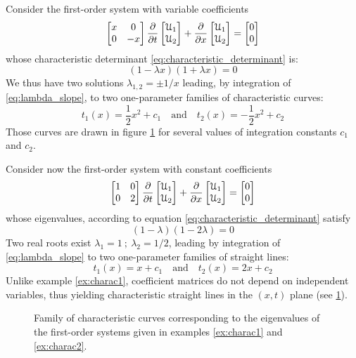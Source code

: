 \begin{example}
  \label{ex:charac1}
  Consider the first-order system with variable coefficients
\begin{equation*}
 \left[\begin{matrix}x &0 \\0 &-x\end{matrix}\right] \frac{\partial }{\partial t} \left[\begin{matrix}\mathcal{U}_1 \\ \mathcal{U}_2\end{matrix}\right] + \frac{\partial }{\partial x}\left[\begin{matrix}\mathcal{U}_1 \\ \mathcal{U}_2\end{matrix}\right] = \left[\begin{matrix}0 \\0\end{matrix}\right]
\end{equation*}
whose characteristic determinant \eqref{eq:characteristic_determinant} is:
\begin{equation*}
  (1-\lambda x)(1+\lambda x)=0
\end{equation*}
We thus have two solutions $\lambda_{1,2}=\pm 1/x$ leading, by integration of \eqref{eq:lambda_slope}, to two one-parameter families of characteristic curves:
\begin{equation*}
  t_1(x)=\frac{1}{2}x^2+c_1  \quad \text{and} \quad t_2(x)=-\frac{1}{2}x^2+c_2 
\end{equation*}
Those curves are drawn in figure \ref{fig:exampleCharac} for several values of integration constants $c_1$ and $c_2$.
\end{example}
\begin{example}
  \label{ex:charac2}
  Consider now the first-order system with constant coefficients
\begin{equation*}
 \left[\begin{matrix}1 &0 \\0 &2\end{matrix}\right] \frac{\partial }{\partial t} \left[\begin{matrix}\mathcal{U}_1 \\ \mathcal{U}_2\end{matrix}\right] + \frac{\partial }{\partial x}\left[\begin{matrix}\mathcal{U}_1 \\ \mathcal{U}_2\end{matrix}\right] = \left[\begin{matrix}0 \\0\end{matrix}\right]
\end{equation*}
whose eigenvalues, according to equation \eqref{eq:characteristic_determinant} satisfy
\begin{equation*}
  (1 - \lambda )(1- 2\lambda)=0
\end{equation*}
Two real roots exist $\lambda_1=1 \: ; \: \lambda_2=1/2$, leading by integration of \eqref{eq:lambda_slope} to two one-parameter families of straight lines:
\begin{equation*}
  t_1(x)=x+c_1  \quad \text{and} \quad t_2(x)=2x+c_2 
\end{equation*}
Unlike example \ref{ex:charac1}, coefficient matrices do not depend on independent variables, thus yielding characteristic straight lines in the $(x,t)$ plane (see \ref{fig:exampleCharac}).
\end{example}
\begin{figure}[h]
  \centering
  \caption{Family of characteristic curves corresponding to the eigenvalues of the first-order systems given in examples \ref{ex:charac1} and \ref{ex:charac2}.}
  \label{fig:exampleCharac}
\end{figure}

